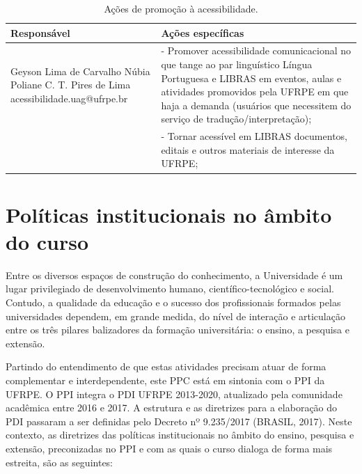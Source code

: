 \documentclass[
	12pt,				%
	openright,			%
  oneside,     %
	a4paper,			%
 hyphens,
	chapter=TITLE,		%
	english,			%
	french,				%
	spanish,			%
	brazil				%
	]{abntex2}
\begin{document}
\begin{center}
  
  \begin{scriptsize}
    \begin{longtable}{p{5cm}p{9cm}}
      \caption{\label{quadro:acoes-promocao-acessibilidade}Ações de promoção à acessibilidade.}\\
      \toprule
      \textbf{Responsável} & \textbf{Ações específicas}\\ 
        \midrule
        Geyson Lima de Carvalho \newline Núbia Poliane C. T. Pires de Lima \newline acessibilidade.uag@ufrpe.br
        & - Promover acessibilidade comunicacional no que tange ao par linguístico Língua Portuguesa e LIBRAS em eventos, aulas e atividades promovidos pela UFRPE em que haja a demanda (usuários que necessitem do serviço de tradução/interpretação);\\
        \addlinespace
        & - Tornar acessível em LIBRAS documentos, editais e outros materiais de interesse da UFRPE;\\
        
      \bottomrule
\end{longtable}
\end{scriptsize}      
\end{center}





%
%




\chapter{Políticas institucionais no âmbito do curso}

Entre os diversos espaços de construção do conhecimento, a Universidade é um lugar privilegiado de desenvolvimento humano, científico-tecnológico e social. Contudo, a qualidade da educação e o sucesso dos profissionais formados pelas universidades dependem, em grande medida, do nível de interação e articulação entre os três pilares balizadores da formação universitária: o ensino, a pesquisa e extensão.

Partindo do entendimento de que estas atividades precisam atuar de forma complementar e interdependente, este PPC está em sintonia com o PPI da UFRPE. O PPI integra o PDI UFRPE 2013-2020, atualizado pela comunidade acadêmica entre 2016 e 2017. A estrutura e as diretrizes para a elaboração do PDI passaram a ser definidas pelo Decreto nº 9.235/2017 (BRASIL, 2017). Neste contexto, as diretrizes das políticas institucionais no âmbito do ensino, pesquisa e extensão, preconizadas no PPI e com as quais o curso dialoga de forma mais estreita, são as seguintes:
\end{document}
